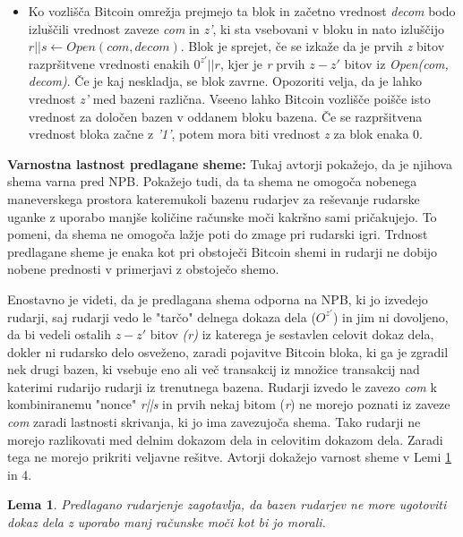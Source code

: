 \documentclass[12pt]{article}
\newtheorem{lema}{Lema}
\begin{document}
\begin{itemize}
	\item Ko vozlišča Bitcoin omrežja prejmejo ta blok in začetno vrednost \textit{decom} bodo izluščili vrednost zaveze \textit{com} in \textit{z'}, ki sta vsebovani v bloku in nato izluščijo \textit{$ r||s \leftarrow Open(com,decom)$}. Blok je sprejet, če se izkaže da je prvih \textit{z} bitov razpršitvene vrednosti enakih $0^{z'}||r$, kjer je \textit{r} prvih \textit{$z-z'$} bitov iz \textit{Open(com, decom)}. Če je kaj neskladja, se blok zavrne. Opozoriti velja, da je lahko vrednost \textit{z'} med bazeni različna. Vseeno lahko Bitcoin vozlišče poišče isto vrednost za določen bazen v oddanem bloku bazena. Če se razpršitvena vrednost bloka začne z \textit{'1'}, potem mora biti vrednost \textit{z} za blok enaka 0.
\end{itemize}

\noindent\textbf{Varnostna lastnost predlagane sheme:} Tukaj avtorji \cite{originalarticle} pokažejo, da je njihova shema varna pred NPB. Pokažejo tudi, da ta shema ne omogoča nobenega maneverskega prostora kateremukoli bazenu rudarjev za reševanje rudarske uganke z uporabo manjše količine računske moči kakršno sami pričakujejo. To pomeni, da shema ne omogoča lažje poti do zmage pri rudarski igri. Trdnost predlagane sheme je enaka kot pri obstoječi Bitcoin shemi in rudarji ne dobijo nobene prednosti v primerjavi z obstoječo shemo.

Enostavno je videti, da je predlagana shema odporna na NPB, ki jo izvedejo rudarji, saj rudarji vedo le "tarčo" delnega dokaza dela ($O^{z'}$) in jim ni dovoljeno, da bi vedeli ostalih $z-z'$ bitov \textit{(r)} iz katerega je sestavlen celovit dokaz dela, dokler ni rudarsko delo osveženo, zaradi pojavitve Bitcoin bloka, ki ga je zgradil nek drugi bazen, ki vsebuje eno ali več transakcij iz množice transakcij nad katerimi rudarijo rudarji iz trenutnega bazena. Rudarji izvedo le zavezo \textit{com} k kombiniranemu "nonce" \textit{r||s} in prvih nekaj bitom (\textit{r}) ne morejo poznati iz zaveze \textit{com} zaradi lastnosti skrivanja, ki jo ima zavezujoča shema. Tako rudarji ne morejo razlikovati med delnim dokazom dela in celovitim dokazom dela. Zaradi tega ne morejo prikriti veljavne rešitve. Avtorji dokažejo varnost sheme v  Lemi \ref{lema3} in 4.

\begin{lema}\label{lema3}
	Predlagano rudarjenje zagotavlja, da bazen rudarjev ne more ugotoviti dokaz dela z uporabo manj računske moči kot bi jo morali.
\end{lema}
\end{document}
